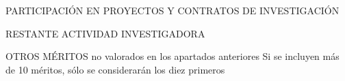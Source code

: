 \documentclass{cvunizar}
\begin{document}
\begin{bloque}{PARTICIPACI\'{O}N EN PROYECTOS Y CONTRATOS DE INVESTIGACI\'{O}N}
	
\end{bloque}
\newpage


\begin{bloque}{RESTANTE ACTIVIDAD INVESTIGADORA}
	
\end{bloque}
\newpage
    
    

\begin{bloque}{%
	OTROS M\'{E}RITOS {\Large no valorados en los apartados anteriores}\newline
	{\large Si se incluyen m\'{a}s de 10 méritos, s\'{o}lo se considerar\'{a}n los diez primeros}%
	}%
	
\end{bloque}
\end{document}
